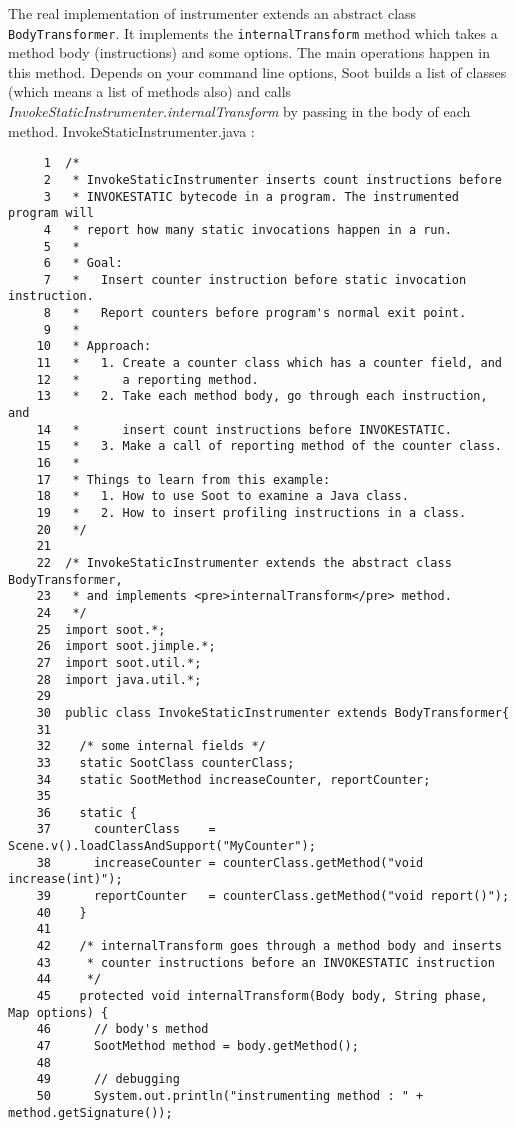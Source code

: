 \documentclass[12pt]{article}
\begin{document}
\noindent
The real implementation of instrumenter extends an abstract class
{\tt BodyTransformer}. It implements the {\tt internalTransform}
method which takes a method body (instructions) and some options. 
The main operations happen in this method. Depends on your command
line options, Soot builds a list of classes (which means a list of
methods also) and calls {\em InvokeStaticInstrumenter.internalTransform}
by passing in the body of each method. 
{\Large InvokeStaticInstrumenter.java :}
\begin{verbatim}
     1  /*
     2   * InvokeStaticInstrumenter inserts count instructions before
     3   * INVOKESTATIC bytecode in a program. The instrumented program will
     4   * report how many static invocations happen in a run.
     5   *
     6   * Goal:
     7   *   Insert counter instruction before static invocation instruction.
     8   *   Report counters before program's normal exit point.
     9   *
    10   * Approach:
    11   *   1. Create a counter class which has a counter field, and
    12   *      a reporting method.
    13   *   2. Take each method body, go through each instruction, and
    14   *      insert count instructions before INVOKESTATIC.
    15   *   3. Make a call of reporting method of the counter class.
    16   *
    17   * Things to learn from this example:
    18   *   1. How to use Soot to examine a Java class.
    19   *   2. How to insert profiling instructions in a class.
    20   */
    21
    22  /* InvokeStaticInstrumenter extends the abstract class BodyTransformer,
    23   * and implements <pre>internalTransform</pre> method.
    24   */
    25  import soot.*;
    26  import soot.jimple.*;
    27  import soot.util.*;
    28  import java.util.*;
    29
    30  public class InvokeStaticInstrumenter extends BodyTransformer{
    31
    32    /* some internal fields */
    33    static SootClass counterClass;
    34    static SootMethod increaseCounter, reportCounter;
    35
    36    static {
    37      counterClass    = Scene.v().loadClassAndSupport("MyCounter");
    38      increaseCounter = counterClass.getMethod("void increase(int)");
    39      reportCounter   = counterClass.getMethod("void report()");
    40    }
    41
    42    /* internalTransform goes through a method body and inserts
    43     * counter instructions before an INVOKESTATIC instruction
    44     */
    45    protected void internalTransform(Body body, String phase, Map options) {
    46      // body's method
    47      SootMethod method = body.getMethod();
    48
    49      // debugging
    50      System.out.println("instrumenting method : " + method.getSignature());

\end{verbatim}
\end{document}
